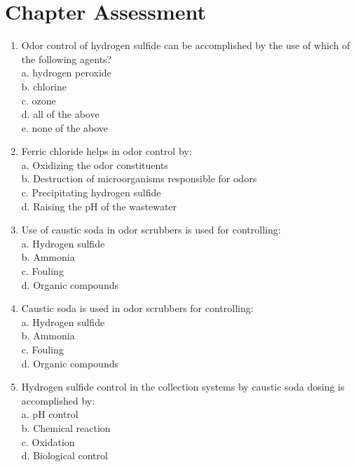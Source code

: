 \newpage
\section*{Chapter Assessment}
\begin{tcolorbox}[breakable, enhanced,
colframe=blue!25,
colback=blue!10,
coltitle=blue!20!black,  
title= Chapter Assessment]

\begin{enumerate}

\item Odor control of hydrogen sulfide can be accomplished by the use of which of the following agents? \\

a. hydrogen peroxide \\
b. chlorine \\
c. ozone \\
d. all of the above \\
e. none of the above 

\item Ferric chloride helps in odor control by:\\

a. Oxidizing the odor constituents\\
b. Destruction of microorganisms responsible for odors \\
c. Precipitating hydrogen sulfide \\
d. Raising the pH of the wastewater \\

\item Use of caustic soda in odor scrubbers is used for controlling:\\

a. Hydrogen sulfide\\
b. Ammonia \\
c. Fouling\\
d. Organic compounds\\

\item Caustic soda is used in odor scrubbers for controlling:\\

a. Hydrogen sulfide\\
b. Ammonia \\
c. Fouling\\
d. Organic compounds\\


\item Hydrogen sulfide control in the collection systems by caustic soda dosing is accomplished by: \\

a. pH control\\
b. Chemical reaction\\
c. Oxidation \\
d. Biological control\\
\end{enumerate}
\end{tcolorbox}